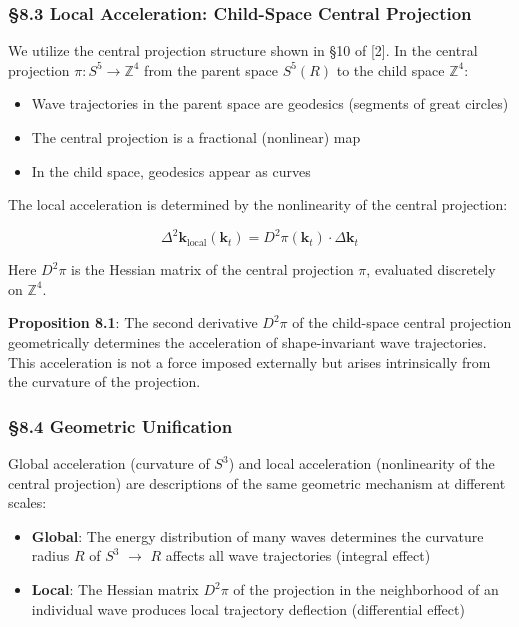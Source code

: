 \documentclass[
  a4paper,11pt]{article}
\providecommand{\tightlist}{%
  \setlength{\itemsep}{0pt}\setlength{\parskip}{0pt}}
\theoremstyle{definition}
\theoremstyle{remark}
\begin{document}
\subsubsection{§8.3 Local Acceleration: Child-Space Central
Projection}\label{local-acceleration-child-space-central-projection}

We utilize the central projection structure shown in §10 of {[}2{]}. In
the central projection \(\pi : S^5 \to \mathbb{Z}^4\) from the parent
space \(S^5(R)\) to the child space \(\mathbb{Z}^4\):

\begin{itemize}
\tightlist
\item
  Wave trajectories in the parent space are geodesics (segments of great
  circles)
\item
  The central projection is a fractional (nonlinear) map
\item
  In the child space, geodesics appear as curves
\end{itemize}

The local acceleration is determined by the nonlinearity of the central
projection:

\[\Delta^2\mathbf{k}_{\text{local}}(\mathbf{k}_t) = D^2\pi(\mathbf{k}_t) \cdot \Delta\mathbf{k}_t\]

Here \(D^2\pi\) is the Hessian matrix of the central projection \(\pi\),
evaluated discretely on \(\mathbb{Z}^4\).

\textbf{Proposition 8.1}: The second derivative \(D^2\pi\) of the
child-space central projection geometrically determines the acceleration
of shape-invariant wave trajectories. This acceleration is not a force
imposed externally but arises intrinsically from the curvature of the
projection.

\subsubsection{§8.4 Geometric Unification}\label{geometric-unification}

Global acceleration (curvature of \(S^3\)) and local acceleration
(nonlinearity of the central projection) are descriptions of the same
geometric mechanism at different scales:

\begin{itemize}
\tightlist
\item
  \textbf{Global}: The energy distribution of many waves determines the
  curvature radius \(R\) of \(S^3\) \(\to\) \(R\) affects all wave
  trajectories (integral effect)
\item
  \textbf{Local}: The Hessian matrix \(D^2\pi\) of the projection in the
  neighborhood of an individual wave produces local trajectory
  deflection (differential effect)
\end{itemize}
\end{document}
